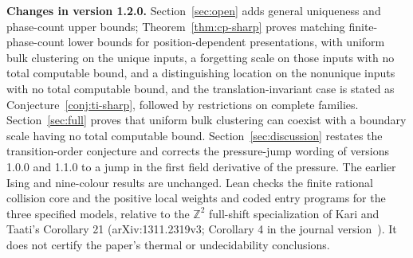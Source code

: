 \documentclass[11pt,a4paper]{article}
\theoremstyle{remark}
\numberwithin{equation}{section}
\newcommand{\Z}{\mathbb Z}
\begin{document}
\textbf{Changes in version 1.2.0.} Section~\ref{sec:open} adds general uniqueness and phase-count upper bounds; Theorem~\ref{thm:cp-sharp} proves matching finite-phase-count lower bounds for position-dependent presentations, with uniform bulk clustering on the unique inputs, a forgetting scale on those inputs with no total computable bound, and a distinguishing location on the nonunique inputs with no total computable bound, and the translation-invariant case is stated as Conjecture~\ref{conj:ti-sharp}, followed by restrictions on complete families. Section~\ref{sec:full} proves that uniform bulk clustering can coexist with a boundary scale having no total computable bound. Section~\ref{sec:discussion} restates the transition-order conjecture and corrects the pressure-jump wording of versions 1.0.0 and 1.1.0 to a jump in the first field derivative of the pressure. The earlier Ising and nine-colour results are unchanged. Lean checks the finite rational collision core and the positive local weights and coded entry programs for the three specified models, relative to the $\Z^2$ full-shift specialization of Kari and Taati's Corollary 21 (arXiv:1311.2319v3; Corollary 4 in the journal version~\cite{KT}). It does not certify the paper's thermal or undecidability conclusions.
\normalsize
\clearpage
{\small\tableofcontents}
\clearpage















\appendix

\begingroup\small


\endgroup
\end{document}
